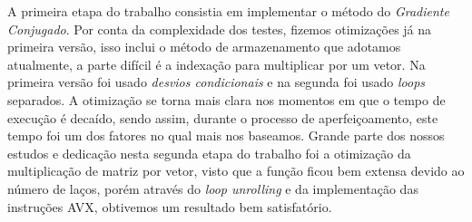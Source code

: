 \documentclass[12pt]{article}
\begin{document}
A primeira etapa do trabalho consistia em implementar o método do \textit{Gradiente Conjugado}. Por conta da complexidade dos testes, fizemos otimizações já na primeira versão, isso inclui o método de armazenamento que adotamos atualmente, a parte difícil é a indexação para multiplicar por um vetor. Na primeira versão foi usado \textit{desvios condicionais} e na segunda foi usado \textit{loops} separados. A otimização se torna mais clara nos momentos em que o tempo de execução é decaído, sendo assim, durante o processo de aperfeiçoamento, este tempo foi um dos fatores no qual mais nos baseamos. Grande parte dos nossos estudos e dedicação nesta segunda etapa do trabalho foi a otimização da multiplicação de matriz por vetor, visto que a função ficou bem extensa devido ao número de laços, porém através do \textit{loop unrolling} e da implementação das instruções AVX, obtivemos um resultado bem satisfatório.
\end{document}
